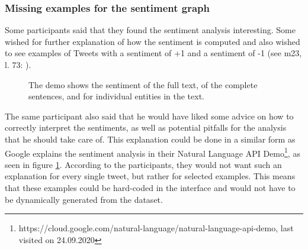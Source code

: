 \subsubsection*{Missing examples for the sentiment graph}\label{sec:missingExamples}
Some participants said that they found the sentiment analysis interesting. Some wished for further explanation of how the sentiment is computed and also wished to see examples of Tweets with a sentiment of +1 and a sentiment of -1 (see m23, l. 73: ).

\begin{figure}[htb!]
    \centering
    \caption{The demo shows the sentiment of the full text, of the complete sentences, and for individual entities in the text.}
    \label{fig:sentiment_google}
\end{figure}

The same participant also said that he would have liked some advice on how to correctly interpret the sentiments, as well as potential pitfalls for the analysis that he should take care of. This explanation could be done in a similar form as Google explains the sentiment analysis in their Natural Language API Demo\footnote{https://cloud.google.com/natural-language/natural-language-api-demo, last visited on 24.09.2020}, as seen in figure \ref{fig:sentiment_google}. According to the participants, they would not want such an explanation for every single tweet, but rather for selected examples. This means that these examples could be hard-coded in the interface and would not have to be dynamically generated from the dataset.

